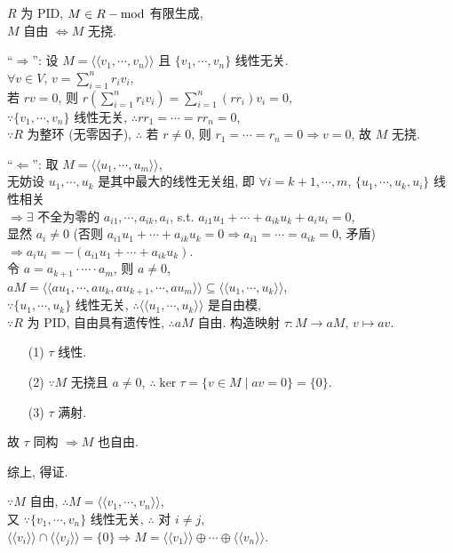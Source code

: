 \documentclass{note}
\begin{document}
\begin{thm}[(课本定理 6.6)]
    $R$ 为 PID, $M\in R-\operatorname{mod}$ 有限生成,\\
    $M$ 自由 $\Longleftrightarrow M$ 无挠.
\end{thm}
\begin{pf}
    ``$\Longrightarrow$'': 设 $M=\langle\langle v_1,\cdots,v_n\rangle\rangle$ 且 $\{v_1,\cdots,v_n\}$ 线性无关.\\
    $\forall v\in V$, $v=\sum_{i=1}^nr_iv_i$,\\
    若 $rv=0$, 则 $r\left(\sum_{i=1}^nr_iv_i\right)=\sum_{i=1}^n(rr_i)v_i=0$,\\
    $\because\{v_1,\cdots,v_n\}$ 线性无关, $\therefore rr_1=\cdots=rr_n=0$,\\
    $\because R$ 为整环 (无零因子), $\therefore$ 若 $r\neq 0$, 则 $r_1=\cdots=r_n=0\Longrightarrow v=0$, 故 $M$ 无挠.

    ``$\Longleftarrow$'': 取 $M=\langle\langle u_1,\cdots,u_m\rangle\rangle$,\\
    无妨设 $u_1,\cdots,u_k$ 是其中最大的线性无关组, 即 $\forall i=k+1,\cdots,m$, $\{u_1,\cdots,u_k,u_i\}$ 线性相关\\
    $\Longrightarrow\exists$ 不全为零的 $a_{i1},\cdots,a_{ik},a_i$, s.t. $a_{i1}u_1+\cdots+a_{ik}u_k+a_iu_i=0$,\\
    显然 $a_i\neq 0$ (否则 $a_{i1}u_1+\cdots+a_{ik}u_k=0\Longrightarrow a_{i1}=\cdots=a_{ik}=0$, 矛盾) $\Longrightarrow a_iu_i=-(a_{i1}u_1+\cdots+a_{ik}u_k)$.\\
    令 $a=a_{k+1}\cdot\cdots\cdot a_m$, 则 $a\neq 0$,\\
    $aM=\langle\langle au_1,\cdots,au_k,au_{k+1},\cdots,au_m\rangle\rangle\subseteq\langle\langle u_1,\cdots,u_k\rangle\rangle$,\\
    $\because\{u_1,\cdots,u_k\}$ 线性无关, $\therefore\langle\langle u_1,\cdots,u_k\rangle\rangle$ 是自由模,\\
    $\because R$ 为 PID, 自由具有遗传性, $\therefore aM$ 自由.
    构造映射 $\tau:M\rightarrow aM$, $v\mapsto av$.
    \begin{itemize}
        \item[(1)] $\tau$ 线性.
        \item[(2)] $\because M$ 无挠且 $a\neq 0$, $\therefore\ker\tau=\{v\in M\mid av=0\}=\{0\}$.
        \item[(3)] $\tau$ 满射.
    \end{itemize}
    故 $\tau$ 同构 $\Longrightarrow M$ 也自由.

    综上, 得证.
\end{pf}
$\because M$ 自由, $\therefore M=\langle\langle v_1,\cdots,v_n\rangle\rangle$,\\
又 $\because \{v_1,\cdots,v_n\}$ 线性无关, $\therefore$ 对 $i\neq j$, $\langle\langle v_i\rangle\rangle\cap\langle\langle v_j\rangle\rangle=\{0\}\Longrightarrow M=\langle\langle v_1\rangle\rangle\oplus\cdots\oplus\langle\langle v_n\rangle\rangle$.
\end{document}
